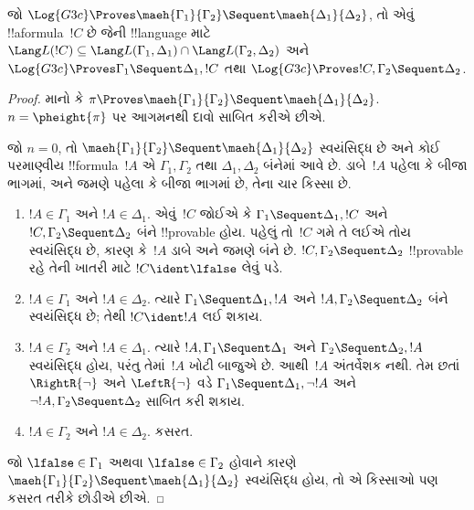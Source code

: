 \documentclass[../../../include/open-logic-section]{subfiles}
\begin{document}
\begin{lem}[માએહારાનું ઉપપ્રમેય]
જો $\Log{G3c}
\Proves \maeh{\Gamma_1}{\Gamma_2} \Sequent \maeh{\Delta_1}{\Delta_2}$,
તો એવું !!a{formula}~$!C$ છે
જેની !!{language} માટે
$\Lang L(!C)
\subseteq \Lang L(\Gamma_1,
\Delta_1) \cap \Lang L(\Gamma_2, \Delta_2)$
અને
$\Log{G3c} \Proves \Gamma_1 \Sequent \Delta_1, !C$
તથા
$\Log{G3c} \Proves !C,
\Gamma_2 \Sequent \Delta_2$.
\end{lem}

\begin{proof}
  માનો કે $\pi \Proves \maeh{\Gamma_1}{\Gamma_2} \Sequent
  \maeh{\Delta_1}{\Delta_2}$.
  $n=\pheight{\pi}$ પર આગમનથી
  દાવો સાબિત કરીએ છીએ.

  જો $n=0$, તો
  $\maeh{\Gamma_1}{\Gamma_2} \Sequent
  \maeh{\Delta_1}{\Delta_2}$
  સ્વયંસિદ્ધ છે અને કોઈ પરમાણ્વીય
  !!{formula}~$!A$ એ
  $\Gamma_1, \Gamma_2$ તથા
  $\Delta_1, \Delta_2$ બંનેમાં આવે છે.
  ડાબે~$!A$ પહેલા કે બીજા ભાગમાં,
  અને જમણે પહેલા કે બીજા ભાગમાં છે,
  તેના ચાર કિસ્સા છે.
  \begin{enumerate}
    \item $!A \in \Gamma_1$ અને $!A \in \Delta_1$.
    એવું~$!C$ જોઈએ કે
    $\Gamma_1 \Sequent \Delta_1, !C$ અને
    $!C, \Gamma_2 \Sequent \Delta_2$
    બંને !!{provable} હોય.
    પહેલું તો~$!C$ ગમે તે લઈએ
    તોય સ્વયંસિદ્ધ છે, કારણ કે~$!A$
    ડાબે અને જમણે બંને છે.
    $!C, \Gamma_2 \Sequent \Delta_2$
    !!{provable} રહે તેની ખાતરી માટે
    $!C \ident \lfalse$ લેવું પડે.
    \item $!A \in \Gamma_1$ અને
    $!A \in \Delta_2$. ત્યારે
    $\Gamma_1 \Sequent \Delta_1, !A$
    અને $!A, \Gamma_2 \Sequent \Delta_2$
    બંને સ્વયંસિદ્ધ છે; તેથી
    $!C \ident !A$ લઈ શકાય.
    \item $!A \in \Gamma_2$ અને
    $!A \in \Delta_1$. ત્યારે
    $!A, \Gamma_1 \Sequent \Delta_1$
    અને $\Gamma_2 \Sequent \Delta_2, !A$
    સ્વયંસિદ્ધ હોય, પરંતુ તેમાં~$!A$
    ખોટી બાજુએ છે. આથી~$!A$
    અંતર્વેશક નથી. તેમ છતાં
    $\RightR{\lnot}$ અને
    $\LeftR{\lnot}$ વડે
    $\Gamma_1 \Sequent \Delta_1, \lnot!A$
    અને $\lnot !A, \Gamma_2 \Sequent \Delta_2$
    સાબિત કરી શકાય.
    \item $!A \in \Gamma_2$ અને
    $!A \in \Delta_2$. કસરત.
  \end{enumerate}
  જો $\lfalse \in \Gamma_1$
  અથવા $\lfalse \in \Gamma_2$
  હોવાને કારણે
  $\maeh{\Gamma_1}{\Gamma_2} \Sequent
  \maeh{\Delta_1}{\Delta_2}$
  સ્વયંસિદ્ધ હોય, તો એ કિસ્સાઓ
  પણ કસરત તરીકે છોડીએ છીએ.


\end{proof}
\end{document}
